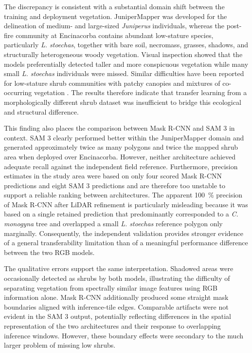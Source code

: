 \documentclass[12pt,a4paper]{article}
\begin{document}
The discrepancy is consistent with a substantial domain shift between the training and deployment vegetation. JuniperMapper was developed for the delineation of medium- and large-sized \textit{Juniperus} individuals, whereas the post-fire community at Encinacorba contains abundant low-stature species, particularly \textit{L. stoechas}, together with bare soil, necromass, grasses, shadows, and structurally heterogeneous woody vegetation. Visual inspection showed that the models preferentially detected taller and more conspicuous vegetation while many small \textit{L. stoechas} individuals were missed. Similar difficulties have been reported for low-stature shrub communities with patchy canopies and mixtures of co-occurring vegetation \citep{uyeda2020vegetation}. The results therefore indicate that transfer learning from a morphologically different shrub dataset was insufficient to bridge this ecological and structural difference.

This finding also places the comparison between Mask R-CNN and SAM 3 in context. SAM 3 clearly performed better within the JuniperMapper domain and generated approximately twice as many polygons and twice the mapped shrub area when deployed over Encinacorba. However, neither architecture achieved adequate recall against the independent field reference. Furthermore, precision estimates in the study area were based on only four scored Mask R-CNN predictions and eight SAM 3 predictions and are therefore too unstable to support a reliable ranking between architectures. The apparent \qty{100}{\percent} precision of Mask R-CNN after LiDAR refinement is particularly misleading because it was based on a single retained prediction that predominantly corresponded to a \textit{C. monogyna} tree and overlapped a small \textit{L. stoechas} reference polygon only marginally. Consequently, the independent validation provides stronger evidence of a general transferability limitation than of a meaningful performance difference between the two RGB models.

The qualitative errors support the same interpretation. Shadowed areas were occasionally detected as shrubs by both models, illustrating the difficulty of separating vegetation from spectrally similar image features using RGB information alone. Mask R-CNN additionally produced some straight mask boundaries aligned with inference-tile edges. Comparable artifacts were not evident in the SAM 3 output, potentially reflecting differences in the spatial representation of the two architectures and their response to overlapping inference windows. However, these boundary effects were secondary to the much larger problem of missing low shrubs.
\end{document}
